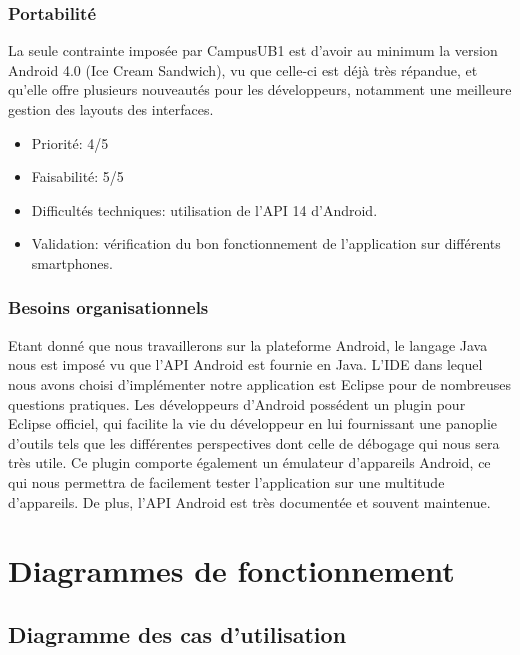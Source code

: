 \documentclass [pdftex,12pt] {report}
\begin{document}
\subsection{Portabilité}
La seule contrainte imposée par CampusUB1 est d'avoir au minimum la version Android 4.0 (Ice Cream Sandwich), vu que celle-ci est déjà très répandue, et qu'elle offre plusieurs nouveautés pour les développeurs, notamment une meilleure gestion des layouts des interfaces. \\

\begin{itemize}
\renewcommand{\labelitemi}{$\bullet$}
\item Priorité: 4/5
\item Faisabilité: 5/5
\item Difficultés techniques: utilisation de l'API 14 d'Android.
\item Validation: vérification du bon fonctionnement de l'application sur différents smartphones.
\end{itemize} 

\subsection{Besoins organisationnels}
Etant donné que nous travaillerons sur la plateforme Android, le langage Java nous est imposé vu que l'API Android est fournie en Java.
L'IDE dans lequel nous avons choisi d'implémenter notre application est Eclipse pour de nombreuses questions pratiques. Les développeurs d'Android possédent un plugin pour Eclipse officiel, qui facilite la vie du développeur en lui fournissant une panoplie d'outils tels que les différentes perspectives dont celle de débogage qui nous sera très utile. Ce plugin comporte également un émulateur d'appareils Android, ce qui nous permettra de facilement tester l'application sur une multitude d'appareils. De plus, l'API Android est très documentée et souvent maintenue.



\chapter{Diagrammes de fonctionnement}

\section{Diagramme des cas d'utilisation}
\end{document}
